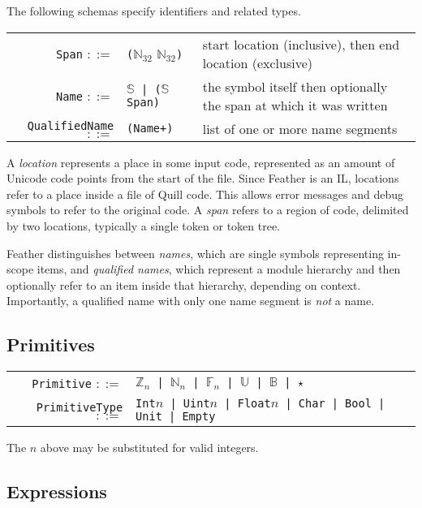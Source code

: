\documentclass[11pt]{book}
\begin{document}
The following schemas specify identifiers and related types.

\begin{tabular}{r l p{6cm}}
    \lstinline!Span! \( ::= \) & \lstinline!(!\( \mathbb N_{32} \) \( \mathbb N_{32} \)\lstinline!)! & start location (inclusive), then end location (exclusive) \\
    \lstinline!Name! \( ::= \) & \( \mathbb S \)\lstinline! | (!\( \mathbb S \)\lstinline! Span)! & the symbol itself then optionally the span at which it was written \\
    \lstinline!QualifiedName! \( ::= \) & \lstinline!(Name+)! & list of one or more name segments
\end{tabular}

A \textit{location} represents a place in some input code, represented as an amount of Unicode code points from the start of the file.
Since Feather is an IL, locations refer to a place inside a file of Quill code.
This allows error messages and debug symbols to refer to the original code.
A \textit{span} refers to a region of code, delimited by two locations, typically a single token or token tree.

Feather distinguishes between \textit{names}, which are single symbols representing in-scope items, and \textit{qualified names}, which represent a module hierarchy and then optionally refer to an item inside that hierarchy, depending on context.
Importantly, a qualified name with only one name segment is \textit{not} a name.

\subsection{Primitives}

\begin{tabular}{r l p{7cm}}
    \lstinline!Primitive! \( ::= \) & \( \mathbb Z_{n} \)\lstinline! | !\( \mathbb N_{n} \)\lstinline! | !\( \mathbb F_{n} \)\lstinline! | !\( \mathbb U \)\lstinline! | !\( \mathbb B \)\lstinline! | !\( \star \) \\
    \lstinline!PrimitiveType! \( ::= \) & \lstinline!Int!\( n \)\lstinline! | Uint!\( n \)\lstinline! | Float!\( n \)\lstinline! | Char | Bool | Unit | Empty!
\end{tabular}

The \( n \) above may be substituted for valid integers.

\subsection{Expressions}
\end{document}
